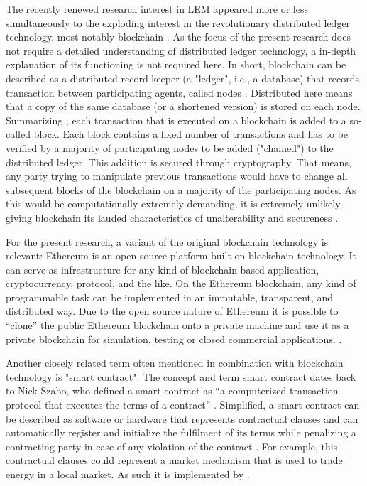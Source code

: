 The recently renewed research interest in LEM appeared more or less simultaneously to the exploding interest in the revolutionary distributed ledger technology, most notably blockchain \citep{Swan:2015}. As the focus of the present research does not require a detailed understanding of distributed ledger technology, a in-depth explanation of its functioning is not required here. In short, blockchain can be described as a distributed record keeper (a "ledger", i.e., a database) that records transaction between participating agents, called nodes \citep{Burger:2016}. Distributed here means that a copy of the same database (or a shortened version) is stored on each node. Summarizing \citet{Tapscott:2016}, each transaction that is executed on a blockchain is added to a so-called block. Each block contains a fixed number of transactions and has to be verified by a majority of participating nodes to be added ("chained") to the distributed ledger. This addition is secured through cryptography. That means, any party trying to manipulate previous transactions would have to change all subsequent blocks of the blockchain on a majority of the participating nodes. As this would be computationally extremely demanding, it is extremely unlikely, giving blockchain its lauded characteristics of unalterability and secureness \citep{Burger:2016}.

For the present research, a variant of the original blockchain technology is relevant: Ethereum is an open source platform built on blockchain technology. It can serve as infrastructure for any kind of blockchain-based application, cryptocurrency, protocol, and the like. On the Ethereum blockchain, any kind of programmable task can be implemented in an immutable, transparent, and distributed way. Due to the open source nature of Ethereum it is possible to “clone” the public Ethereum blockchain onto a private machine and use it as a private blockchain for simulation, testing or closed commercial applications. \citep{Ethereum:2018doc, Swan:2015}.

Another closely related term often mentioned in combination with blockchain technology is "smart contract". The concept and term smart contract dates back to Nick Szabo, who defined a smart contract as “a computerized transaction protocol that executes the terms of a contract” \citep{szabo:1994}. Simplified, a smart contract can be described as software or hardware that represents contractual clauses and can automatically register and initialize the fulfilment of its terms while penalizing a contracting party in case of any violation of the contract \citep{Szabo:1997}. For example, this contractual clauses could represent a market mechanism that is used to trade energy in a local market. As such it is implemented by \citet{Mengelkamp:2018a}.


